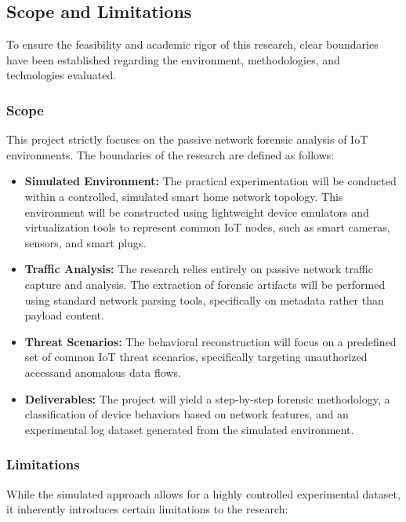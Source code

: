 \subsection{Scope and Limitations}
To ensure the feasibility and academic rigor of this research, clear boundaries have been established regarding the environment, methodologies, and technologies evaluated.

\subsubsection{Scope}
This project strictly focuses on the passive network forensic analysis of IoT environments. The boundaries of the research are defined as follows:
\begin{itemize}
	\item \textbf{Simulated Environment:} The practical experimentation will be conducted within a controlled, simulated smart home network topology. This environment will be constructed using lightweight device emulators and virtualization tools to represent common IoT nodes, such as smart cameras, sensors, and smart plugs.
	\item \textbf{Traffic Analysis:} The research relies entirely on passive network traffic capture and analysis. The extraction of forensic artifacts will be performed using standard network parsing tools, specifically on metadata rather than payload content.
	\item \textbf{Threat Scenarios:} The behavioral reconstruction will focus on a predefined set of common IoT threat scenarios, specifically targeting unauthorized accessand anomalous data flows.
	\item \textbf{Deliverables:} The project will yield a step-by-step forensic methodology, a classification of device behaviors based on network features, and an experimental log dataset generated from the simulated environment.
\end{itemize}

\subsubsection{Limitations}
While the simulated approach allows for a highly controlled experimental dataset, it inherently introduces certain limitations to the research:

